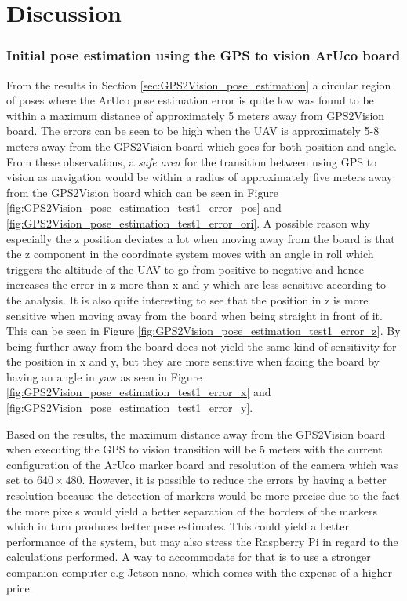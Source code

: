 \documentclass[../Head/report.tex]{subfiles}
\begin{document}
\section{Discussion}
\label{sec:discussion}

\subsubsection*{Initial pose estimation using the GPS to vision ArUco board}
From the results in Section \ref{sec:GPS2Vision_pose_estimation} a circular region of poses where the ArUco pose estimation error is quite low was found to be within a maximum distance of approximately 5 meters away from GPS2Vision board. The errors can be seen to be high when the UAV is approximately 5-8 meters away from the GPS2Vision board which goes for both position and angle. From these observations, a \textit{safe area} for the transition between using GPS to vision as navigation would be within a radius of approximately five meters away from the GPS2Vision board which can be seen in Figure \ref{fig:GPS2Vision_pose_estimation_test1_error_pos} and \ref{fig:GPS2Vision_pose_estimation_test1_error_ori}. A possible reason why especially the z position deviates a lot when moving away from the board is that the z component in the coordinate system moves with an angle in roll which triggers the altitude of the UAV to go from positive to negative and hence increases the error in z more than x and y which are less sensitive according to the analysis. It is also quite interesting to see that the position in z is more sensitive when moving away from the board when being straight in front of it. This can be seen in Figure \ref{fig:GPS2Vision_pose_estimation_test1_error_z}. By being further away from the board does not yield the same kind of sensitivity for the position in x and y, but they are more sensitive when facing the board by having an angle in yaw as seen in Figure \ref{fig:GPS2Vision_pose_estimation_test1_error_x} and \ref{fig:GPS2Vision_pose_estimation_test1_error_y}.   

Based on the results, the maximum distance away from the GPS2Vision board when executing the GPS to vision transition will be 5 meters with the current configuration of the ArUco marker board and resolution of the camera which was set to $640 \times 480$. However, it is possible to reduce the errors by having a better resolution because the detection of markers would be more precise due to the fact the more pixels would yield a better separation of the borders of the markers which in turn produces better pose estimates. This could yield a better performance of the system, but may also stress the Raspberry Pi in regard to the calculations performed. A way to accommodate for that is to use a stronger companion computer e.g Jetson nano, which comes with the expense of a higher price.
\end{document}
